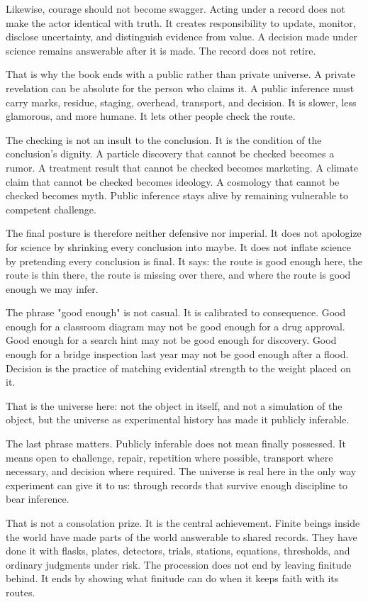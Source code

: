 \begin{movementclose}
Likewise, courage should not become swagger. Acting under a record does not
make the actor identical with truth. It creates responsibility to update,
monitor, disclose uncertainty, and distinguish evidence from value. A
decision made under science remains answerable after it is made. The record
does not retire.

That is why the book ends with a public rather than private universe. A
private revelation can be absolute for the person who claims it. A public
inference must carry marks, residue, staging, overhead, transport, and
decision. It is slower, less glamorous, and more humane. It lets other people
check the route.

The checking is not an insult to the conclusion. It is the condition of the
conclusion's dignity. A particle discovery that cannot be checked becomes a
rumor. A treatment result that cannot be checked becomes marketing. A climate
claim that cannot be checked becomes ideology. A cosmology that cannot be
checked becomes myth. Public inference stays alive by remaining vulnerable to
competent challenge.

The final posture is therefore neither defensive nor imperial. It
does not apologize for science by shrinking every conclusion into maybe. It
does not inflate science by pretending every conclusion is final. It says:
the route is good enough here, the route is thin there, the route is missing
over there, and where the route is good enough we may infer.

The phrase "good enough" is not casual. It is calibrated to consequence. Good
enough for a classroom diagram may not be good enough for a drug approval.
Good enough for a search hint may not be good enough for discovery. Good
enough for a bridge inspection last year may not be good enough after a flood.
Decision is the practice of matching evidential strength to the weight placed
on it.

That is the universe here: not the object in itself, and not a
simulation of the object, but the universe as experimental history has made it
publicly inferable.

The last phrase matters. Publicly inferable does not mean finally possessed.
It means open to challenge, repair, repetition where possible, transport where
necessary, and decision where required. The universe is real here in
the only way experiment can give it to us: through records that survive enough
discipline to bear inference.

That is not a consolation prize. It is the central achievement. Finite beings
inside the world have made parts of the world answerable to shared records.
They have done it with flasks, plates, detectors, trials, stations,
equations, thresholds, and ordinary judgments under risk. The procession does
not end by leaving finitude behind. It ends by showing what finitude can do
when it keeps faith with its routes.


\end{movementclose}
